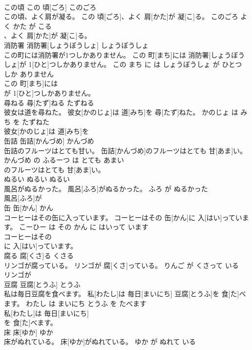 \documentclass[8pt]{extreport}
\begin{document}
\begin{CJK}{UTF8}{min}
\\	この頃	この 頃[ごろ]	このごろ	
\\	この頃、よく肩が凝る。	この 頃[ごろ]、よく 肩[かた]が 凝[こ]る。	このごろ よく かた が こる	
\\	、よく 肩[かた]が 凝[こ]る。			
\\	消防署	消防署[しょうぼうしょ]	しょうぼうしょ	
\\	この町には消防署が1つしかありません。	この 町[まち]には 消防署[しょうぼうしょ]が 1[ひと]つしかありません。	この まち に は しょうぼうしょ が ひとつ しか ありません	
\\	この 町[まち]には
\\	が 1[ひと]つしかありません。			
\\	尋ねる	尋[たず]ねる	たずねる	
\\	彼女は道を尋ねた。	彼女[かのじょ]は 道[みち]を 尋[たず]ねた。	かのじょ は みち を たずねた	
\\	彼女[かのじょ]は 道[みち]を
\\	缶詰	缶詰[かんづめ]	かんづめ	
\\	缶詰のフルーツはとても甘い。	缶詰[かんづめ]のフルーツはとても 甘[あま]い。	かんづめ の ふるーつ は とても あまい	
\\	のフルーツはとても 甘[あま]い。			
\\	ぬるい	ぬるい	ぬるい	
\\	風呂がぬるかった。	風呂[ふろ]がぬるかった。	ふろ が ぬるかった	
\\	風呂[ふろ]が
\\	缶	缶[かん]	かん	
\\	コーヒーはその缶に入っています。	コーヒーはその 缶[かん]に 入[はい]っています。	こーひー は その かん に はいって います	
\\	コーヒーはその
\\	に 入[はい]っています。			
\\	腐る	腐[くさ]る	くさる	
\\	リンゴが腐っている。	リンゴが 腐[くさ]っている。	りんご が くさって いる	
\\	リンゴが
\\	豆腐	豆腐[とうふ]	とうふ	
\\	私は毎日豆腐を食べます。	私[わたし]は 毎日[まいにち] 豆腐[とうふ]を 食[た]べます。	わたし は まいにち とうふ を たべます	
\\	私[わたし]は 毎日[まいにち]
\\	を 食[た]べます。			
\\	床	床[ゆか]	ゆか	
\\	床がぬれている。	床[ゆか]がぬれている。	ゆか が ぬれて いる	

\end{CJK}
\end{document}
